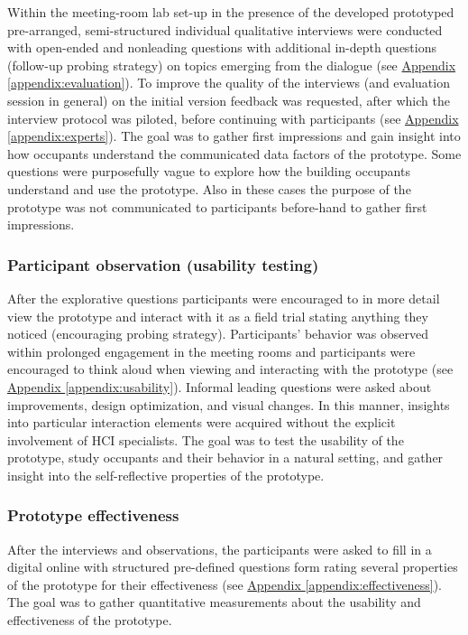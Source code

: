 Within the meeting-room lab set-up in the presence of the developed prototyped pre-arranged, semi-structured individual qualitative interviews were conducted with open-ended and nonleading questions with additional in-depth questions (follow-up probing strategy) on topics emerging from the dialogue (see \hyperref[appendix:evaluation]{Appendix \ref*{appendix:evaluation}}). To improve the quality of the interviews (and evaluation session in general) on the initial version feedback was requested, after which the interview protocol was piloted, before continuing with participants (see \hyperref[appendix:experts]{Appendix \ref*{appendix:experts}}). The goal was to gather first impressions and gain insight into how occupants understand the communicated data factors of the prototype. Some questions were purposefully vague to explore how the building occupants understand and use the prototype. Also in these cases the purpose of the prototype was not communicated to participants before-hand to gather first impressions. 

\subsubsection{Participant observation (usability testing)}

After the explorative questions participants were encouraged to in more detail view the prototype and interact with it as a field trial stating anything they noticed (encouraging probing strategy). Participants' behavior was observed within prolonged engagement in the meeting rooms and participants were encouraged to think aloud when viewing and interacting with the prototype (see \hyperref[appendix:usability]{Appendix \ref*{appendix:usability}}). Informal leading questions were asked about improvements, design optimization, and visual changes. In this manner, insights into particular interaction elements were acquired without the explicit involvement of HCI specialists. The goal was to test the usability of the prototype, study occupants and their behavior in a natural setting, and gather insight into the self-reflective properties of the prototype. 

\subsubsection{Prototype effectiveness}

After the interviews and observations, the participants were asked to fill in a digital online with structured pre-defined questions form rating several properties of the prototype for their effectiveness (see \hyperref[appendix:effectiveness]{Appendix \ref*{appendix:effectiveness}}). The goal was to gather quantitative measurements about the usability and effectiveness of the prototype.

